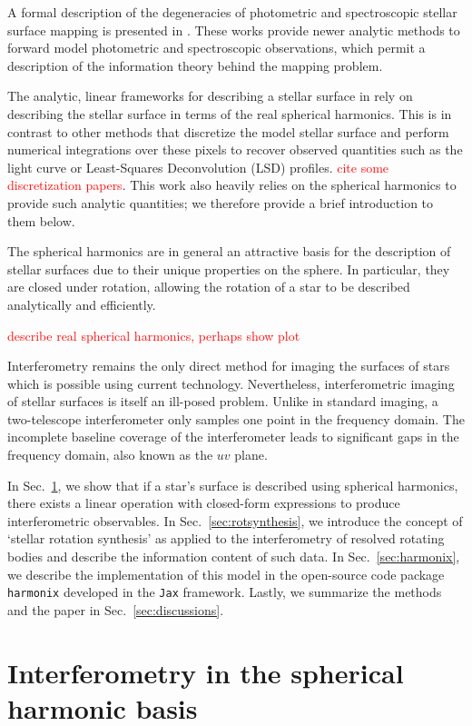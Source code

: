 \documentclass[modern]{aastex631}
\begin{document}
A formal description of the degeneracies of photometric and spectroscopic stellar surface mapping is presented in \citet{luger2021a, Luger2021b}. These works provide newer analytic methods to forward model photometric and spectroscopic observations, which permit a description of the information theory behind the mapping problem. 

The analytic, linear frameworks for describing a stellar surface in \citet{luger2021a, Luger2021b} rely on describing the stellar surface in terms of the real spherical harmonics. This is in contrast to other methods that discretize the model stellar surface and perform numerical integrations over these pixels to recover observed quantities such as the light curve or Least-Squares Deconvolution (LSD) profiles. \textcolor{red}{cite some discretization papers}. This work also heavily relies on the spherical harmonics to provide such analytic quantities; we therefore provide a brief introduction to them below. 

The spherical harmonics are in general an attractive basis for the description of stellar surfaces due to their unique properties on the sphere. In particular, they are closed under rotation, allowing the rotation of a star to be described analytically and efficiently. 

\textcolor{red}{describe real spherical harmonics, perhaps show plot}

Interferometry remains the only direct method for imaging the surfaces of stars which is possible using current technology. Nevertheless, interferometric imaging of stellar surfaces is itself an ill-posed problem. Unlike in standard imaging, a two-telescope interferometer only samples one point in the frequency domain. The incomplete baseline coverage of the interferometer leads to significant gaps in the frequency domain, also known as the $uv$ plane.

In Sec.~\ref{sec:maps}, we show that if a star's surface is described using spherical harmonics, there exists a linear operation with closed-form expressions to produce interferometric observables. In Sec.~\ref{sec:rotsynthesis}, we introduce the concept of `stellar rotation synthesis' as applied to the interferometry of resolved rotating bodies and describe the information content of such data. In  Sec.~\ref{sec:harmonix}, we describe the implementation of this model in the open-source code package \texttt{harmonix} developed in the \texttt{Jax} framework. Lastly, we summarize the methods and the paper in Sec.~\ref{sec:discussions}.
\section{Interferometry in the spherical harmonic basis}
\label{sec:maps}
\end{document}
